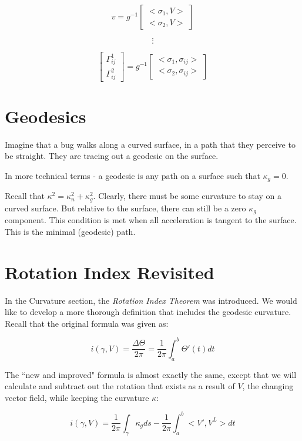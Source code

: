 \documentclass{article}
\begin{document}
\[ v = g^{-1} 
 \begin{bmatrix}
<\sigma_{1}, V>\\
<\sigma_{2}, V>
\end{bmatrix}
\]

\[ \vdots \]

\[ 
\begin{bmatrix}
\Gamma_{ij}^{1}\\
\Gamma_{ij}^{2}
\end{bmatrix}
= g^{-1} 
 \begin{bmatrix}
<\sigma_{1}, \sigma_{ij}>\\
<\sigma_{2}, \sigma_{ij}>
\end{bmatrix}
\]

\section{Geodesics}

Imagine that a bug walks along a curved surface, in a path that they perceive to be straight. They are tracing out a geodesic on the surface. 

In more technical terms - a geodesic is any path on a surface such that $\kappa_{g} = 0$.

Recall that $\kappa^2 = \kappa_{n}^2 + \kappa_{g}^2$. Clearly, there must be some curvature to stay on a curved surface. But relative to the surface, there can still be a zero $\kappa_{g}$ component. This condition is met when all acceleration is tangent to the surface. This is the minimal (geodesic) path.

\section{Rotation Index Revisited}

In the Curvature section, the {\it{Rotation Index Theorem}} was introduced. We would like to develop a more thorough definition that includes the geodesic curvature. Recall that the original formula was given as:

\[i(\gamma, V) = \frac{\Delta \Theta}{2 \pi} = \frac{1}{2 \pi} \int_{a}^{b}\Theta'(t)dt \]

The ``new and improved" formula is almost exactly the same, except that we will calculate and subtract out the rotation that exists as a result of $V$, the changing vector field, while keeping the curvature $\kappa$:

\[i(\gamma, V) = \frac{1}{2 \pi} \int_{\gamma} \kappa_{g} ds - \frac{1}{2 \pi} \int_{a}^{b} <V', V^L > dt\]
\end{document}
